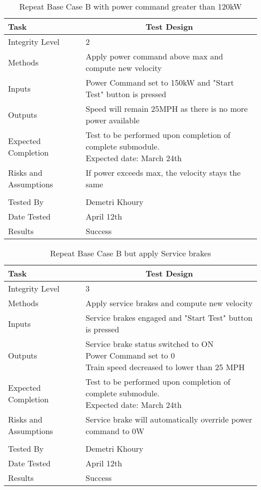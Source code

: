 \documentclass[]{article}
\begin{document}
	\begin{table}[H]
		\centering
		\caption{Repeat Base Case B with power command greater than 120kW }
		\begin{tabular}{|l|l|}
			\hline
			Task & \multicolumn{1}{c|}{Test Design} \\ \hline
			Integrity Level & 2 \\ \hline
			Methods & Apply power command above max and compute new velocity  \\ \hline
			Inputs &  Power Command set to 150kW and "Start Test" button is pressed \\ \hline
			Outputs &  Speed will remain 25MPH as there is no more power available  \\ \hline
			Expected Completion & \parbox[t]{10cm}{Test to be performed upon completion of complete submodule.\\ Expected date: March 24th}\\ \hline
			Risks and Assumptions & If power exceeds max, the velocity stays the same\\ \hline
			\\ \hline
			Tested By   &  Demetri Khoury\\	\hline
			Date Tested & \parbox[t]{10cm}{April 12th}\\ \hline
			Results & Success\\ \hline
		\end{tabular}
	\end{table}

	\begin{table}[H]
		\centering
		\caption{Repeat Base Case B but apply Service brakes}
		\begin{tabular}{|l|l|}
			\hline
			Task & \multicolumn{1}{c|}{Test Design} \\ \hline
			Integrity Level & 3 \\ \hline
			Methods & Apply service brakes and compute new velocity  \\ \hline
			Inputs &  Service brakes engaged and "Start Test" button is pressed \\ \hline
			Outputs & \parbox[t]{10cm}{ Service brake status switched to ON\\ Power Command set to 0\\ Train speed decreased to lower than 25 MPH  }\\ \hline
			Expected Completion & \parbox[t]{10cm}{Test to be performed upon completion of complete submodule.\\ Expected date: March 24th}\\ \hline
			Risks and Assumptions & Service brake will automatically override power command to 0W\\ \hline
			\\ \hline
			Tested By   &  Demetri Khoury\\	\hline
			Date Tested & \parbox[t]{10cm}{April 12th}\\ \hline
			Results & Success\\ \hline
		\end{tabular}
	\end{table}
\end{document}
